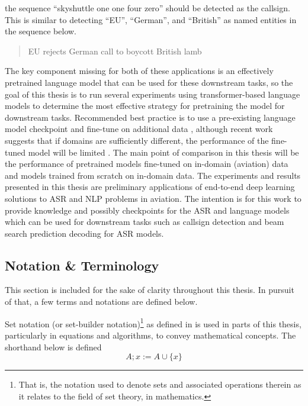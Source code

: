 \documentclass[12pt]{article}
\begin{document}
\noindent
the sequence ``skyshuttle one one four zero'' should be detected as the callsign. This is similar to detecting ``EU'', ``German'', and ``British'' as
named entities in the sequence below.

\begin{quote}
    EU rejects German call to boycott British lamb
\end{quote}

The key component missing for both of these applications is an effectively pretrained language model that can be used for these downstream tasks, so
the goal of this thesis is to run several experiments using transformer-based language models to determine the most effective strategy for pretraining
the model for downstream tasks. Recommended best practice is to use a pre-existing language model checkpoint and fine-tune on additional data
\cite{devlin_bert_2019,liu_roberta_2019,lewis_bart_2019}, although recent work suggests that if domains are sufficiently different, the performance
of the fine-tuned model will be limited \cite{yadlowsky_pretraining_2023}. The main point of comparison in this thesis will be the performance of
pretrained models fine-tuned on in-domain (aviation) data and models trained from scratch on in-domain data. The experiments and results presented in
this thesis are preliminary applications of end-to-end deep learning solutions to ASR and NLP problems in aviation. The intention is for this work to
provide knowledge and possibly checkpoints for the ASR and language models which can be used for downstream tasks such as callsign detection and beam
search prediction decoding for ASR models.

\subsection{Notation \& Terminology}
This section is included for the sake of clarity throughout this thesis. In pursuit of that, a few terms and notations are defined below.

Set notation (or set-builder notation)\footnote{That is, the notation used to denote sets and associated operations therein as it relates to the field
    of set theory, in mathematics.} as defined in \cite{jech_chapter_1978} is used in parts of this thesis, particularly in equations and algorithms,
to convey mathematical concepts. The shorthand below is defined
\begin{equation*}
    A; x := A \cup \{x\}
\end{equation*}
\end{document}

